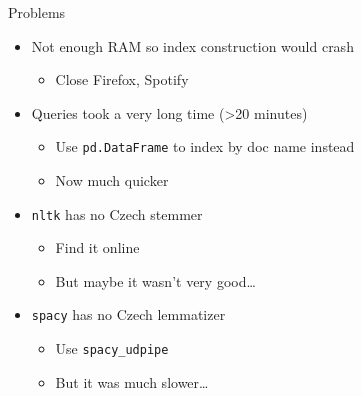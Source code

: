 \documentclass{beamer}
\begin{document}
\begin{frame}{Problems}

\begin{itemize}

	\item<1-> Not enough RAM so index construction would crash
		\begin{itemize}
			\item<2-> Close Firefox, Spotify
		\end{itemize}
	\item<3-> Queries took a very long time (>20 minutes)
	\begin{itemize}
		\item<4-> Use \texttt{pd.DataFrame} to index by doc name instead
		\item<4-> Now much quicker
	\end{itemize}
	\item<5-> \texttt{nltk} has no Czech stemmer
		\begin{itemize}
			\item<6-> Find it online
			\item<6-> But maybe it wasn't very good\ldots
		\end{itemize}
	\item<7-> \texttt{spacy} has no Czech lemmatizer
		\begin{itemize}
			\item<8-> Use \texttt{spacy\_udpipe}
			\item<8-> But it was much slower\ldots
		\end{itemize}

\end{itemize}

\end{frame}
\end{document}
